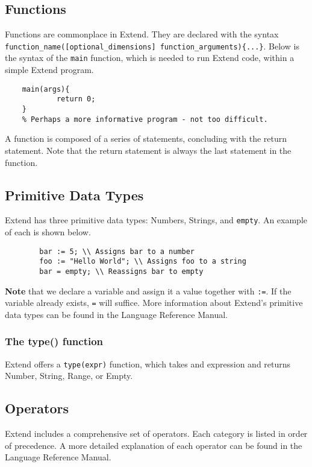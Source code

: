 	\subsection{Functions}
	Functions are commonplace in Extend. They are declared with the syntax \texttt{function\_name([optional\_dimensions] function\_arguments)\{...\}}. Below is the syntax of the \texttt{main} function, which is needed to run Extend code, within a simple Extend program.

	\begin{lstlisting}
	main(args){
			return 0;
	}
	% Perhaps a more informative program - not too difficult.
	\end{lstlisting}

	\medskip \noindent
	A function is composed of a series of statements, concluding with the return statement.
	Note that the return statement is always the last statement in the function.

	\subsection{Primitive Data Types}
	Extend has three primitive data types: Numbers, Strings, and \texttt{empty}. An example of each is shown below.

	\begin{lstlisting}
		bar := 5; \\ Assigns bar to a number
		foo := "Hello World"; \\ Assigns foo to a string
		bar = empty; \\ Reassigns bar to empty
	\end{lstlisting}

	\medskip \noindent
	\textbf{Note} that we declare a variable and assign it a value together with \texttt{:=}. If the variable already exists, \texttt{=} will suffice.
	More information about Extend's primitive data types can be found in the Language Reference Manual.

		\subsubsection{The type() function}
		Extend offers a \texttt{type(expr)} function, which takes and expression and returns Number, String, Range, or Empty.

	\subsection{Operators}
	Extend includes a comprehensive set of operators. Each category is listed in order of precedence. A more detailed explanation of each operator can be found in the Language Reference Manual.

